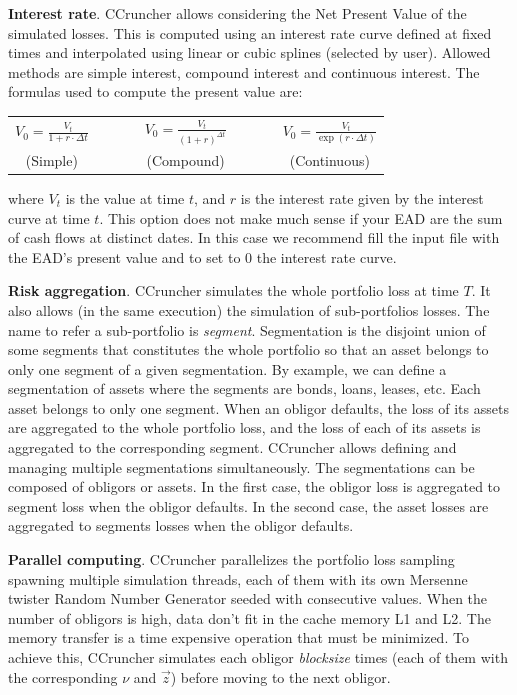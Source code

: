 \documentclass[11pt,fleqn]{book} %
\begin{document}
\textbf{Interest rate}. CCruncher allows considering the Net Present Value 
of the simulated losses. This is computed using an interest rate curve 
defined at fixed times and interpolated using linear or cubic splines 
(selected by user). Allowed methods are simple interest, compound interest 
and continuous interest. The formulas used to compute the present value are:
\begin{center}
	\begin{tabular}{ccccc}
		$V_0 = \frac{V_t}{1+r \cdot \Delta t}$ & $\qquad$ &
		$V_0 = \frac{V_t}{(1+r)^{\Delta t}}$ & $\qquad$ &
		$V_0 = \frac{V_t}{\exp(r \cdot \Delta t)}$ \\
		(Simple) & $\qquad$ & (Compound) & $\qquad$ & (Continuous)
	\end{tabular}
\end{center}
where $V_t$ is the value at time $t$, and $r$ is the interest rate given 
by the interest curve at time $t$. This option does not make much sense
if your EAD are the sum of cash flows at distinct dates. In this case we 
recommend fill the input file with the EAD's present value and to set to 
$0$ the interest rate curve.

\textbf{Risk aggregation}. 
\label{ss:ra}
CCruncher simulates the whole portfolio loss at time $T$. It also allows (in 
the same execution) the simulation of sub-portfolios losses. The name to refer
a sub-portfolio is \emph{segment}. Segmentation is the disjoint union of some 
segments that constitutes the whole portfolio so that an asset belongs to only 
one segment of a given segmentation. By example, we can define a segmentation
of assets where the segments are bonds, loans, leases, etc. Each asset
belongs to only one segment. When an obligor defaults, the loss of its assets
are aggregated to the whole portfolio loss, and the loss of each of its assets
is aggregated to the corresponding segment. CCruncher allows defining and 
managing multiple segmentations simultaneously. The segmentations can be 
composed of obligors or assets. In the first case, the obligor loss is 
aggregated to segment loss when the obligor defaults. In the second case, the 
asset losses are aggregated to segments losses when the obligor defaults.

\textbf{Parallel computing}. 
CCruncher parallelizes the portfolio loss sampling spawning multiple simulation
threads, each of them with its own Mersenne twister Random Number Generator 
seeded with consecutive values. When the number of obligors is high, data 
don't fit in the cache memory L1 and L2. The memory transfer is a time expensive
operation that must be minimized. To achieve this, CCruncher simulates each 
obligor \emph{blocksize} times (each of them with the corresponding $\nu$ and 
$\vec{z}$) before moving to the next obligor.
\end{document}
